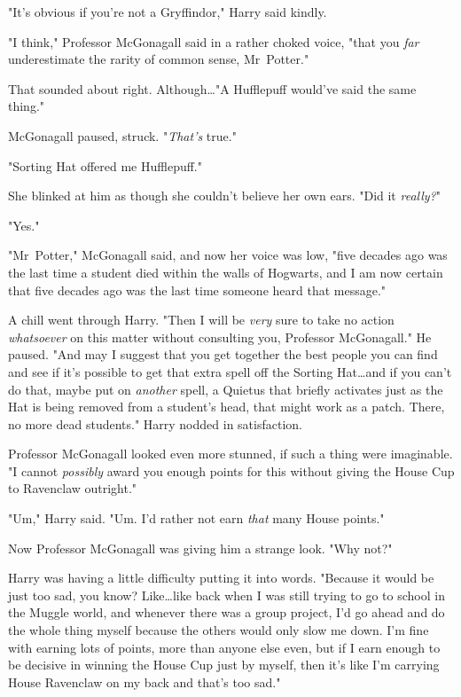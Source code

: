 "It's obvious if you're not a Gryffindor," Harry said kindly.

"I think," Professor McGonagall said in a rather choked voice, "that you
\emph{far} underestimate the rarity of common sense, Mr~Potter."

That sounded about right. Although…"A Hufflepuff would've said the same
thing."

McGonagall paused, struck. "\emph{That's} true."

"Sorting Hat offered me Hufflepuff."

She blinked at him as though she couldn't believe her own ears. "Did it
\emph{really?}"

"Yes."

"Mr~Potter," McGonagall said, and now her voice was low, "five decades ago was
the last time a student died within the walls of Hogwarts, and I am now certain
that five decades ago was the last time someone heard that message."

A chill went through Harry. "Then I will be \emph{very} sure to take no action
\emph{whatsoever} on this matter without consulting you, Professor McGonagall."
He paused. "And may I suggest that you get together the best people you can
find and see if it's possible to get that extra spell off the Sorting
Hat…and if you can't do that, maybe put on \emph{another} spell, a
Quietus that briefly activates just as the Hat is being removed from a
student's head, that might work as a patch. There, no more dead students."
Harry nodded in satisfaction.

Professor McGonagall looked even more stunned, if such a thing were imaginable.
"I cannot \emph{possibly} award you enough points for this without giving the
House Cup to Ravenclaw outright."

"Um," Harry said. "Um. I'd rather not earn \emph{that} many House points."

Now Professor McGonagall was giving him a strange look. "Why not?"

Harry was having a little difficulty putting it into words. "Because it would
be just too sad, you know? Like…like back when I was still trying to go
to school in the Muggle world, and whenever there was a group project, I'd go
ahead and do the whole thing myself because the others would only slow me down.
I'm fine with earning lots of points, more than anyone else even, but if I earn
enough to be decisive in winning the House Cup just by myself, then it's like
I'm carrying House Ravenclaw on my back and that's too sad."

